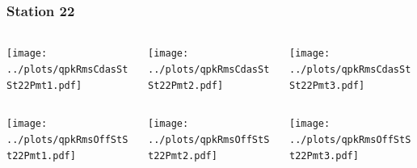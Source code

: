 \documentclass[aspectratio=169]{beamer}
\begin{document}
\begin{frame} 
  \frametitle{Station 22}
  \begin{center}
    \begin{columns}
      \begin{column}{0.33\textwidth}
        \texttt{[image: ../plots/qpkRmsCdasStSt22Pmt1.pdf]}
      \end{column}
      \begin{column}{0.33\textwidth}
        \texttt{[image: ../plots/qpkRmsCdasStSt22Pmt2.pdf]}
      \end{column}
      \begin{column}{0.33\textwidth}
        \texttt{[image: ../plots/qpkRmsCdasStSt22Pmt3.pdf]}
      \end{column}
    \end{columns}
  \end{center}

  \begin{center}
    \begin{columns}
      \begin{column}{0.33\textwidth}
        \texttt{[image: ../plots/qpkRmsOffStSt22Pmt1.pdf]}
      \end{column}
      \begin{column}{0.33\textwidth}
        \texttt{[image: ../plots/qpkRmsOffStSt22Pmt2.pdf]}
      \end{column}
      \begin{column}{0.33\textwidth}
        \texttt{[image: ../plots/qpkRmsOffStSt22Pmt3.pdf]}
      \end{column}
    \end{columns}
  \end{center}
\end{frame}
\end{document}
